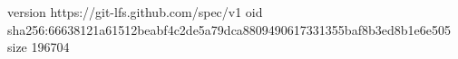 version https://git-lfs.github.com/spec/v1
oid sha256:66638121a61512beabf4c2de5a79dca8809490617331355baf8b3ed8b1e6e505
size 196704
